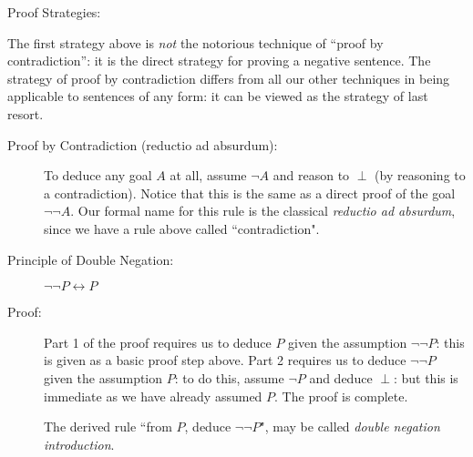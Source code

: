 \documentclass[12pt]{book}
\begin{document}
\begin{description}

\item[Proof Strategies:]

\end{description}

The first strategy above is {\em not\/} the notorious technique of
``proof by contradiction'': it is the direct strategy for proving a
negative sentence.  The strategy of proof by contradiction differs
from all our other techniques in being applicable to sentences of any
form:  it can be viewed as the strategy of last resort.

\begin{description}

\item[Proof by Contradiction (reductio ad absurdum):] To deduce any goal $A$ at all, assume
$\neg A$ and reason to $\perp$ (by reasoning to a contradiction).  Notice that this is the same
as a direct proof of the goal $\neg\neg A$.  Our formal name for this rule is the classical {\em reductio ad absurdum\/}, since we have a rule above called ``contradiction".

\item[Principle of Double Negation:]  $\neg\neg P \leftrightarrow P$

\item[Proof:] Part 1 of the proof requires us to deduce $P$ given the
assumption $\neg\neg P$: this is given as a basic proof step above.
Part 2 requires us to deduce $\neg\neg P$ given the assumption $P$: to
do this, assume $\neg P$ and deduce $\perp$: but this is
immediate as we have already assumed $P$.  The proof is complete.

The derived rule ``from $P$, deduce $\neg\neg P$", may be called {\em double negation introduction\/}.

\end{description}
\end{document}
